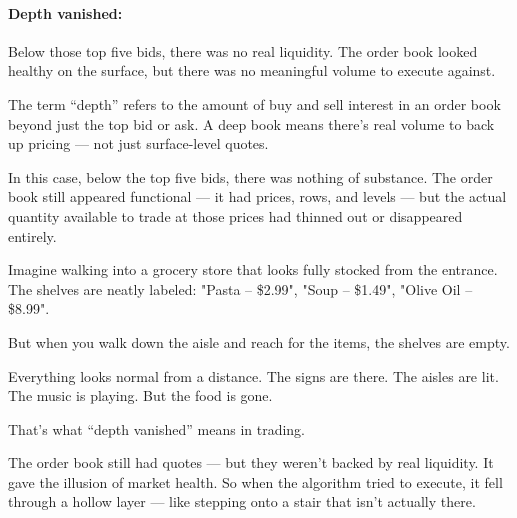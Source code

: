 \paragraph{Depth vanished:} Below those top five bids, there was no real liquidity. The order book looked 
healthy on the surface, but there was no meaningful volume to execute against.

The term “depth” refers to the amount of buy and sell interest in an order book beyond just the top bid or ask. A deep book means 
there's real volume to back up pricing — not just surface-level quotes.

In this case, below the top five bids, there was nothing of substance. The order book still appeared functional — it had prices, 
rows, and levels — but the actual quantity available to trade at those prices had thinned out or disappeared entirely.

Imagine walking into a grocery store that looks fully stocked from the entrance. The shelves are neatly labeled: "Pasta – \$2.99", 
"Soup – \$1.49", "Olive Oil – \$8.99".

But when you walk down the aisle and reach for the items, the shelves are empty.

Everything looks normal from a distance. The signs are there. The aisles are lit. The music is playing.
But the food is gone.

That’s what “depth vanished” means in trading.

The order book still had quotes — but they weren’t backed by real liquidity. It gave the illusion of market health. So when the 
algorithm tried to execute, it fell through a hollow layer — like stepping onto a stair that isn’t actually there.


